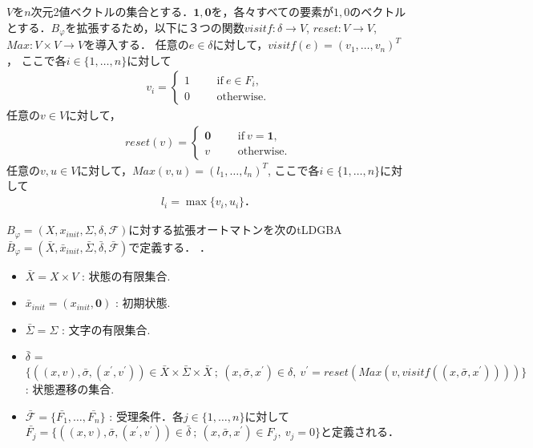 \documentclass[a4j,9pt,twocolumn]{jsarticle}
\theoremstyle{definition}
\begin{document}
$V$を$n$次元2値ベクトルの集合とする．$\bm{1},\bm{0}$を，各々すべての要素が$1,0$のベクトルとする．$B_{\varphi}$を拡張するため，以下に３つの関数$visitf: \delta \to V$, $reset:V \to V$, $Max:V \times V \to V$を導入する．
任意の$e \in \delta$に対して，$visitf(e) = (v_1,\ldots,v_n)^T$，
ここで各$i \in \{ 1,\dots, n \}$に対して
\begin{align}
 v_i =
  \left\{
  \begin{aligned}
    1 &   & &\text{if}\ e\in F_i, \\
    0 &   & &\text{otherwise}.
  \end{aligned}
  \right. \nonumber
\end{align}
任意の$v \in V$に対して，
\begin{align}
  reset(v) =
  \left\{
  \begin{aligned}
    \bm{0} &   & &\text{if}\  v = \bm{1},\\
    v &   & &\text{otherwise}.
  \end{aligned}
  \right. \nonumber
\end{align}
任意の$v,u \in V$に対して，$Max(v,u) = (l_1, \ldots, l_n)^T$,
ここで各$i \in \{ 1,\dots, n \}$に対して
\begin{align}
  l_i = \max \{ v_i, u_i \}．
\end{align}

$B_\varphi = (X,x_{init},\Sigma,\delta,\mathcal{F})$に対する拡張オートマトンを次のtLDGBA $\bar{B}_{\varphi} = (\bar{X},\bar{x}_{init},\bar{\Sigma},\bar{\delta},\bar{\mathcal{F}})$で定義する．
．
\begin{itemize}
  \item $\bar{X} = X \times V$ : 状態の有限集合.
  \item $\bar{x}_{init} = (x_{init}, \bm{0})$ : 初期状態.
  \item $\bar{\Sigma} = \Sigma$ : 文字の有限集合.
  \item $\bar{\delta}$ = $\{ ((x,v), \bar{\sigma}, (x^{\prime},v^{\prime})) \in \bar{X} \times \bar{\Sigma} \times \bar{X}\ ;\ (x,\bar{\sigma},x^{\prime}) \in \delta,\ v^{\prime} = reset(Max(v,visitf((x,\bar{\sigma},x^{\prime})))) \}$: 状態遷移の集合.
  \item $\mathcal{\bar{F}} = \{ \bar{F_1}, \ldots ,\bar{F_n} \}$ : 受理条件．各$j \in \{ 1,\ldots,n \}$に対して$\bar{F_j} = \{ ((x,v), \bar{\sigma}, (x^{\prime},v^{\prime})) \in \bar{\delta}\ ;\ (x, \bar{\sigma}, x^{\prime}) \in F_j,\ v_j = 0\}$と定義される．
\end{itemize}
\end{document}
